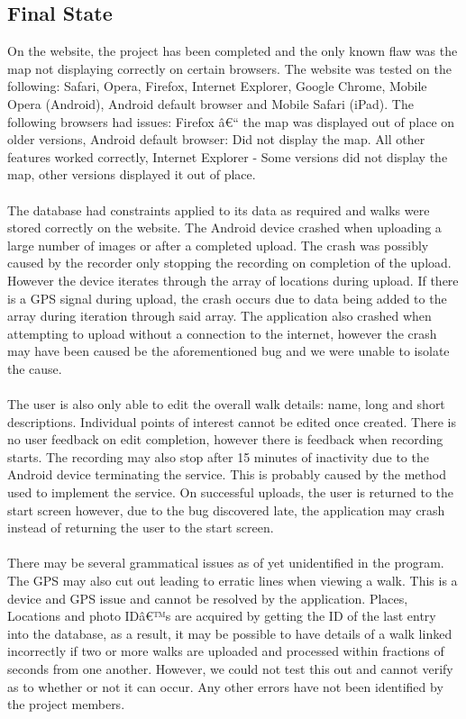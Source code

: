 \documentclass[12pt]{article}
\begin{document}
\subsection{Final State}
On the website, the project has been completed and the only known flaw was the map not displaying correctly on certain browsers. The website was tested on the following: Safari, Opera, Firefox, Internet Explorer, Google Chrome, Mobile Opera (Android), Android default browser and Mobile Safari (iPad). The following browsers had issues: Firefox â€“ the map was displayed out of place on older versions, Android default browser: Did not display the map. All other features worked correctly, Internet Explorer - Some versions did not display the map, other versions displayed it out of place.
\\\\
The database had constraints applied to its data as required and walks were stored correctly on the website. The Android device crashed when uploading a large number of images or after a completed upload. The crash was possibly caused by the recorder only stopping the recording on completion of the upload. However the device iterates through the array of locations during upload. If there is a GPS signal during upload, the crash occurs due to data being added to the array during iteration through said array. The application also crashed when attempting to upload without a connection to the internet, however the crash may have been caused be the aforementioned bug and we were unable to isolate the cause.
\\\\
The user is also only able to edit the overall walk details: name, long and short descriptions. Individual points of interest cannot be edited once created. There is no user feedback on edit completion, however there is feedback when recording starts. The recording may also stop after 15 minutes of inactivity due to the Android device terminating the service. This is probably caused by the method used to implement the service. On successful uploads, the user is returned to the start screen however, due to the bug discovered late, the application may crash instead of returning the user to the start screen. 
\\\\
There may be several grammatical issues as of yet unidentified in the program. The GPS may also cut out leading to erratic lines when viewing a walk. This is a device and GPS issue and cannot be resolved by the application. Places, Locations and photo IDâ€™s are acquired by getting the ID of the last entry into the database, as a result, it may be possible to have details of a walk linked incorrectly if two or more walks are uploaded and processed within fractions of seconds from one another. However, we could not test this out and cannot verify as to whether or not it can occur. Any other errors have not been identified by the project members.
\end{document}
